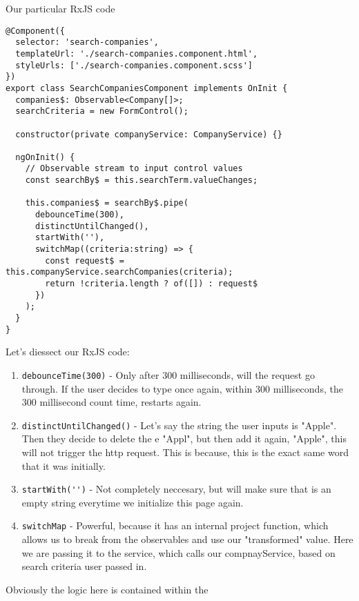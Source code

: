Our particular RxJS code 
\begin{lstlisting}[caption=search-companies.compoennt.ts]
@Component({
  selector: 'search-companies',
  templateUrl: './search-companies.component.html',
  styleUrls: ['./search-companies.component.scss']
})
export class SearchCompaniesComponent implements OnInit {
  companies$: Observable<Company[]>;
  searchCriteria = new FormControl();

  constructor(private companyService: CompanyService) {}

  ngOnInit() {
    // Observable stream to input control values
    const searchBy$ = this.searchTerm.valueChanges;
    
    this.companies$ = searchBy$.pipe(
      debounceTime(300),
      distinctUntilChanged(),
      startWith(''),      
      switchMap((criteria:string) => {
        const request$ = this.companyService.searchCompanies(criteria);
        return !criteria.length ? of([]) : request$          
      })
    );
  }
}  
\end{lstlisting}

Let's diessect our RxJS code: 
\begin{enumerate}
  \item \lstinline{debounceTime(300)} - Only after 300 milliseconds, will the request go through. If the user decides to type once again, within 300 milliseconds, the 300 millisecond count time, restarts again. 
  \item \lstinline{distinctUntilChanged()} - Let's say the string the user inputs is "Apple". Then they decide to delete the e "Appl", but then add it again, "Apple", this will not trigger the http request. This is because, this is the exact same word that it was initially. 
  \item \lstinline{startWith('')} - Not completely neccesary, but will make sure that is an empty string everytime we initialize this page again. 
  \item \lstinline{switchMap} - Powerful, because it has an internal project function, which allows us to break from the observables and use our "transformed" value. Here we are passing it to the service, which calls our compnayService, based on search criteria user passed in. 
\end{enumerate}

Obviously the logic here is contained within the 